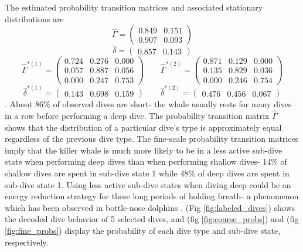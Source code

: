 The estimated probability transition matrices and associated stationary distributions are
%
$$\hat \Gamma = \begin{pmatrix} 
0.849 & 0.151 \\
0.907 & 0.093
\end{pmatrix}$$
$$\hat \delta = \begin{pmatrix} 0.857 & 0.143 \end{pmatrix}$$
%
$$\hat \Gamma^{*(1)} = \begin{pmatrix} 
0.724 & 0.276 & 0.000 \\
0.057 & 0.887 & 0.056 \\
0.000 & 0.247 & 0.753
\end{pmatrix} \qquad 
\hat \Gamma^{*(2)} = \begin{pmatrix} 
0.871 & 0.129 & 0.000 \\
0.135 & 0.829 & 0.036 \\
0.000 & 0.246 & 0.754
\end{pmatrix}$$
$$\hat \delta^{*(1)} = \begin{pmatrix} 0.143 & 0.698 & 0.159 \end{pmatrix} \qquad
\hat \delta^{*(2)} = \begin{pmatrix} 0.476 & 0.456 & 0.067 \end{pmatrix}$$.
%
About 86\% of observed dives are short- the whale usually rests for many dives in a row before performing a deep dive. The probability transition matrix $\hat \Gamma$ shows that the distribution of a particular dive's type is approximately equal regardless of the previous dive type. The fine-scale probability transition matrices imply that the killer whale is much more likely to be in a less active sub-dive state when performing deep dives than when performing shallow dives- 14\% of shallow dives are spent in sub-dive state 1 while 48\% of deep dives are spent in sub-dive state 1. Using less active sub-dive states when diving deep could be an energy reduction strategy for these long periods of holding breath- a phenomenon which has been observed in bottle-nose dolphins \citep{Williams:1999}. (Fig \ref{fig:labeled_dives}) shows the decoded dive behavior of 5 selected dives, and (fig \ref{fig:coarse_probs}) and (fig \ref{fig:fine_probs}) display the probability of each dive type and sub-dive state, respectively.

